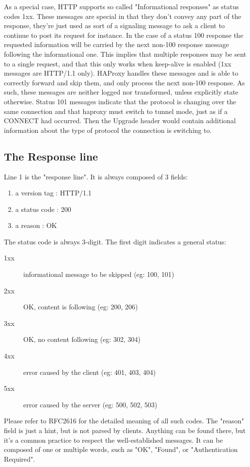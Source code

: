 As a special case, HTTP supports so called "Informational responses" as status
codes 1xx. These messages are special in that they don't convey any part of the
response, they're just used as sort of a signaling message to ask a client to
continue to post its request for instance. In the case of a status 100 response
the requested information will be carried by the next non-100 response message
following the informational one. This implies that multiple responses may be
sent to a single request, and that this only works when keep-alive is enabled
(1xx messages are HTTP/1.1 only). HAProxy handles these messages and is able to
correctly forward and skip them, and only process the next non-100 response. As
such, these messages are neither logged nor transformed, unless explicitly
state otherwise. Status 101 messages indicate that the protocol is changing
over the same connection and that haproxy must switch to tunnel mode, just as
if a CONNECT had occurred. Then the Upgrade header would contain additional
information about the type of protocol the connection is switching to.

\subsection{The Response line}
Line 1 is the "response line". It is always composed of 3 fields:
\begin{enumerate}
\item a version tag : HTTP/1.1
\item a status code : 200
\item a reason      : OK
\end{enumerate}

The status code is always 3-digit. The first digit indicates a general status:
\begin{description}
\item[1xx] informational message to be skipped (eg: 100, 101)
\item[2xx] OK, content is following   (eg: 200, 206)
\item[3xx] OK, no content following   (eg: 302, 304)
\item[4xx] error caused by the client (eg: 401, 403, 404)
\item[5xx] error caused by the server (eg: 500, 502, 503)
\end{description}

Please refer to RFC2616 for the detailed meaning of all such codes. The
"reason" field is just a hint, but is not parsed by clients. Anything can be
found there, but it's a common practice to respect the well-established
messages. It can be composed of one or multiple words, such as "OK", "Found",
or "Authentication Required".

